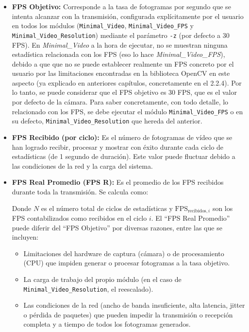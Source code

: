\begin{itemize}
    \item \textbf{FPS Objetivo:} Corresponde a la tasa de fotogramas por segundo que se intenta alcanzar con la transmisión, configurada explícitamente por el usuario en todos los módulos (\texttt{Minimal\_Video}, \texttt{Minimal\_Video\_FPS} y \texttt{Minimal\_Video\_Resolution}) mediante el parámetro \verb|-z| (por defecto a 30 FPS). En \textit{Minimal\_Video} a la hora de ejecutar, no se muestran ninguna estadística relacionada con los FPS (eso lo hace \textit{Minimal\_Video\_FPS}), debido a que que no se puede establecer realmente un FPS concreto por el usuario por las limitaciones encontradas en la biblioteca OpenCV en este aspecto (ya explicado en anteriores capítulos, concretamente en el 2.2.4). Por lo tanto, se puede considerar que el FPS objetivo es 30 FPS, que es el valor por defecto de la cámara. Para saber concretamente, con todo detalle, lo relacionado con los FPS, se debe ejecutar el módulo \texttt{Minimal\_Video\_FPS} o en su defecto, \texttt{Minimal\_Video\_Resolution} que hereda del anterior.

    \item \textbf{FPS Recibido (por ciclo):} Es el número de fotogramas de vídeo que se han logrado recibir, procesar y mostrar con éxito durante cada ciclo de estadísticas (de 1 segundo de duración). Este valor puede fluctuar debido a las condiciones de la red y la carga del sistema.

    \item \textbf{FPS Real Promedio (FPS R):} Es el promedio de los FPS recibidos durante toda la transmisión. Se calcula como:
    \begin{center}
    \end{center}
    Donde \(N\) es el número total de ciclos de estadísticas y \(\text{FPS}_{\text{recibidos},i}\) son los FPS contabilizados como recibidos en el ciclo \(i\). El ``FPS Real Promedio'' puede diferir del ``FPS Objetivo'' por diversas razones, entre las que se incluyen:
    \begin{itemize}
        \item Limitaciones del hardware de captura (cámara) o de procesamiento (CPU) que impiden generar o procesar fotogramas a la tasa objetivo.
        \item La carga de trabajo del propio módulo (en el caso de \texttt{Minimal\_Video\_Resolution}, el reescalado).
        \item Las condiciones de la red (ancho de banda insuficiente, alta latencia, jitter o pérdida de paquetes) que pueden impedir la transmisión o recepción completa y a tiempo de todos los fotogramas generados.
    \end{itemize}


\end{itemize}
